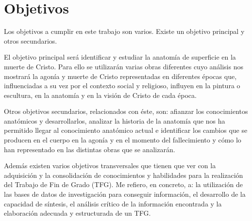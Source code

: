 \section{Objetivos}
Los objetivos a cumplir en este trabajo son varios. Existe un objetivo principal y otros secundarios.

El objetivo principal será identificar y estudiar la anatomía de superficie en la muerte de Cristo. Para ello se utilizarán varias obras diferentes cuyo análisis nos mostrará la agonía y muerte de Cristo representadas en diferentes épocas que, influenciadas a su vez por el contexto social y religioso, influyen en la pintura o escultura, en la anatomía y en la visión de Cristo de cada época.

Otros objetivos secundarios, relacionados con éste, son: afianzar los conocimientos anatómicos y desarrollarlos, analizar la historia de la anatomía que nos ha permitido llegar al conocimiento anatómico actual e identificar los cambios que se producen en el cuerpo en la agonía y en el momento del fallecimiento y cómo lo han representado en las distintas obras que se analizarán.

Además existen varios objetivos transversales que tienen que ver con la adquisición y la consolidación de conocimientos y habilidades para la realización del Trabajo de Fin de Grado (TFG). Me refiero, en concreto, a: la utilización de las bases de datos de investigación para conseguir información, el desarrollo de la capacidad de síntesis, el análisis crítico de la información encontrada y la elaboración adecuada y estructurada de un TFG.